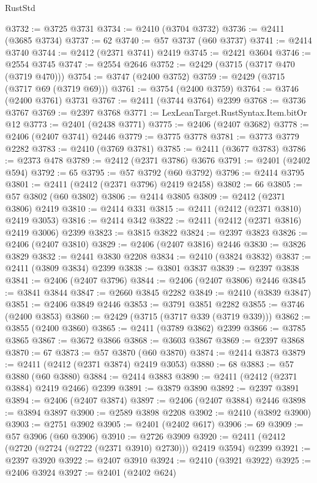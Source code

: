 \begin{lexlean}{RustStd}
\begin{coremodule}
@3732 := @3725 @3731
@3734 := @2410 (@3704 @3732)
@3736 := @2411 (@3685 @3734)
@3737 := 62
@3740 := @57 @3737 (@60 @3737)
@3741 := @2414 @3740
@3744 := @2412 (@2371 @3741) @2419
@3745 := @2421 @3604
@3746 := @2554 @3745
@3747 := @2554 @2646
@3752 := @2429 (@3715 (@3717 @470 (@3719 @470)))
@3754 := @3747 (@2400 @3752)
@3759 := @2429 (@3715 (@3717 @69 (@3719 @69)))
@3761 := @3754 (@2400 @3759)
@3764 := @3746 (@2400 @3761) @3731
@3767 := @2411 (@3744 @3764) @2399
@3768 := @3736 @3767
@3769 := @2397 @3768
@3771 := LexLeanTarget.RustSyntax.Item.bitOr @12
@3773 := @2401 (@2438 @3771)
@3775 := @2406 (@2407 @3682)
@3778 := @2406 (@2407 @3741) @2446
@3779 := @3775 @3778
@3781 := @3773 @3779 @2282
@3783 := @2410 (@3769 @3781)
@3785 := @2411 (@3677 @3783)
@3786 := @2373 @478
@3789 := @2412 (@2371 @3786) @3676
@3791 := @2401 (@2402 @594)
@3792 := 65
@3795 := @57 @3792 (@60 @3792)
@3796 := @2414 @3795
@3801 := @2411 (@2412 (@2371 @3796) @2419 @2458)
@3802 := 66
@3805 := @57 @3802 (@60 @3802)
@3806 := @2414 @3805
@3809 := @2412 (@2371 @3806) @2419
@3810 := @2414 @331
@3815 := @2411 (@2412 (@2371 @3810) @2419 @3053)
@3816 := @2414 @342
@3822 := @2411 (@2412 (@2371 @3816) @2419 @3006) @2399
@3823 := @3815 @3822
@3824 := @2397 @3823
@3826 := @2406 (@2407 @3810)
@3829 := @2406 (@2407 @3816) @2446
@3830 := @3826 @3829
@3832 := @2441 @3830 @2208
@3834 := @2410 (@3824 @3832)
@3837 := @2411 (@3809 @3834) @2399
@3838 := @3801 @3837
@3839 := @2397 @3838
@3841 := @2406 (@2407 @3796)
@3844 := @2406 (@2407 @3806) @2446
@3845 := @3841 @3844
@3847 := @2660 @3845 @2282
@3849 := @2410 (@3839 @3847)
@3851 := @2406 @3849 @2446
@3853 := @3791 @3851 @2282
@3855 := @3746 (@2400 @3853)
@3860 := @2429 (@3715 (@3717 @339 (@3719 @339)))
@3862 := @3855 (@2400 @3860)
@3865 := @2411 (@3789 @3862) @2399
@3866 := @3785 @3865
@3867 := @3672 @3866
@3868 := @3603 @3867
@3869 := @2397 @3868
@3870 := 67
@3873 := @57 @3870 (@60 @3870)
@3874 := @2414 @3873
@3879 := @2411 (@2412 (@2371 @3874) @2419 @3053)
@3880 := 68
@3883 := @57 @3880 (@60 @3880)
@3884 := @2414 @3883
@3890 := @2411 (@2412 (@2371 @3884) @2419 @2466) @2399
@3891 := @3879 @3890
@3892 := @2397 @3891
@3894 := @2406 (@2407 @3874)
@3897 := @2406 (@2407 @3884) @2446
@3898 := @3894 @3897
@3900 := @2589 @3898 @2208
@3902 := @2410 (@3892 @3900)
@3903 := @2751 @3902
@3905 := @2401 (@2402 @617)
@3906 := 69
@3909 := @57 @3906 (@60 @3906)
@3910 := @2726 @3909
@3920 := @2411 (@2412 (@2720 (@2724 (@2722 (@2371 @3910) @2730))) @2419 @3594) @2399
@3921 := @2397 @3920
@3922 := @2407 @3910
@3924 := @2410 (@3921 @3922)
@3925 := @2406 @3924
@3927 := @2401 (@2402 @624)

\end{coremodule}
\end{lexlean}
